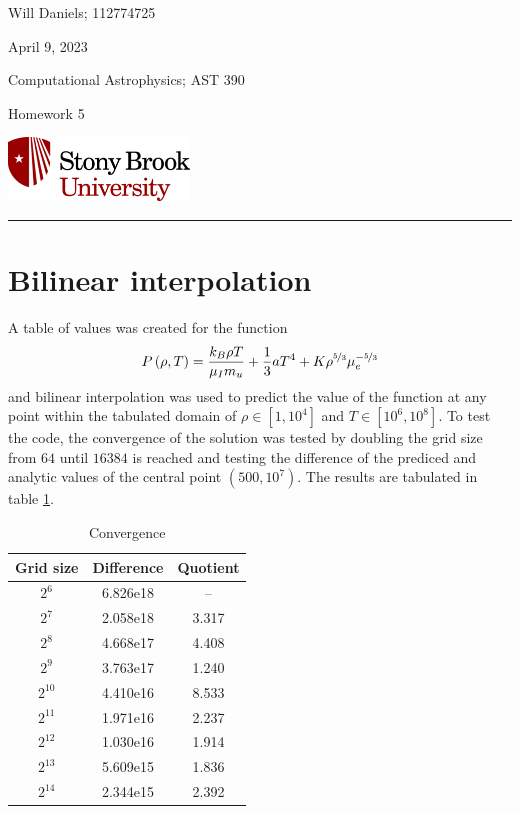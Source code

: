 \documentclass[12pt, letterpaper]{article}
\begin{document}
\noindent
\begin{minipage}{0.5\textwidth}
    Will Daniels; 112774725

    April 9, 2023

    Computational Astrophysics; AST 390

    Homework 5
\end{minipage}
%
\begin{minipage}{0.5\textwidth}
    \begin{flushright}
        \includegraphics[height = 48pt]{../../LatexAssets/SBULogoStacked}
    \end{flushright}
\end{minipage}
\noindent
\rule{\textwidth}{1pt}

\section{Bilinear interpolation}

A table of values was created for the function
\begin{equation}
  P \left(\rho, T\right) =
  \frac{k_B \rho T}{\mu_I m_u} +
  \frac{1}{3} a T^4 +
  K \rho^{\nicefrac{5}{3}} \mu_e^{-\nicefrac{5}{3}}
\end{equation}
and bilinear interpolation was used to predict the value of the function at any
point within the tabulated domain of \(\rho \in \left[ 1, 10^4 \right]\) and
\(T \in \left[ 10^6, 10^8 \right]\). To test the code, the convergence of the
solution was tested by doubling the grid size from \(64\) until \(16384\) is
reached and testing the difference of the prediced and analytic values of the
central point \(\left(500, 10^7\right)\). The results are tabulated in table
\ref{tab:convergence}.

\begin{table}[h]
  \centering
  \caption{Convergence}
  \label{tab:convergence}
  \begin{tabular}{c c c}
    \hline\hline
    Grid size & Difference & Quotient \\
    \hline
    \(2^6\)    & 6.826e18 & --    \\
    \(2^7\)    & 2.058e18 & 3.317 \\
    \(2^8\)    & 4.668e17 & 4.408 \\
    \(2^9\)    & 3.763e17 & 1.240 \\
    \(2^{10}\) & 4.410e16 & 8.533 \\
    \(2^{11}\) & 1.971e16 & 2.237 \\
    \(2^{12}\) & 1.030e16 & 1.914 \\
    \(2^{13}\) & 5.609e15 & 1.836 \\
    \(2^{14}\) & 2.344e15 & 2.392 \\
    \hline\hline
  \end{tabular}
\end{table}
\end{document}
